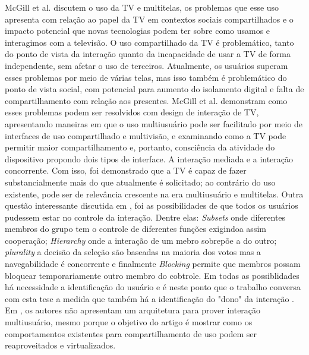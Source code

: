 McGill et al. \cite{mcgill2015review} discutem o uso da TV e multitelas, os problemas que esse uso apresenta com relação ao papel da TV em contextos sociais compartilhados e o impacto potencial que novas tecnologias podem ter sobre como usamos e interagimos com a televisão. O uso compartilhado da TV é problemático, tanto do ponto de vista da interação quanto da incapacidade de usar a TV de forma independente, sem afetar o uso de terceiros. Atualmente, os usuários superam esses problemas por meio de várias telas, mas isso também é problemático do ponto de vista social, com potencial para aumento do isolamento digital e falta de compartilhamento com relação aos presentes. McGill et al. demonstram como esses problemas podem ser resolvidos com design de interação de TV, apresentando maneiras em que o uso multiusuário pode ser facilitado por meio de interfaces de uso compartilhado e multivisão, e examinando como a TV pode permitir maior compartilhamento e, portanto, consciência da atividade do dispositivo propondo dois tipos de interface. A interação mediada e a interação concorrente. Com isso, foi demonstrado que a TV é capaz de fazer substancialmente mais do que atualmente é solicitado; ao contrário do uso existente, pode ser de relevância crescente na era multiusuário e multitelas. Outra questão interessante discutida em \cite{mcgill2015review}, foi as possibilidades de que todos os usuários pudessem estar no controle da interação. Dentre elas: \textit{Subsets} onde diferentes membros do grupo tem o controle de diferentes funções exigindoa assim cooperação; \textit{Hierarchy} onde a interação de um mebro sobrepõe a do outro; \textit{plurality} a decisão da seleção são baseadas na maioria dos votos mas a navegabilidade é concorrente e finalmente \textit{Blocking} permite que membros possam bloquear temporariamente outro membro do cobtrole. Em todas as possiblidades  há necessidade a identificação do usuário e é neste ponto que o trabalho conversa com esta tese a medida que também há a identificação do "dono" da interação . Em \cite{mcgill2015review}, os autores não apresentam um arquitetura para prover interação multiusuário, mesmo porque o objetivo do artigo é mostrar como os comportamentos existentes para compartilhamento de uso podem ser reaproveitados e virtualizados.

